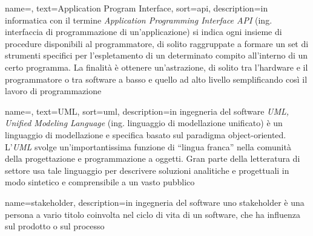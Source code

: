 
\renewcommand{\acronymname}{Acronimi e abbreviazioni}


    
	

\renewcommand{\glossaryname}{Glossario}

{
    name=,
    text=Application Program Interface,
    sort=api,
    description={in informatica con il termine \emph{Application Programming Interface API} (ing. interfaccia di programmazione di un'applicazione) si indica ogni insieme di procedure disponibili al programmatore, di solito raggruppate a formare un set di strumenti specifici per l'espletamento di un determinato compito all'interno di un certo programma. La finalità è ottenere un'astrazione, di solito tra l'hardware e il programmatore o tra software a basso e quello ad alto livello semplificando così il lavoro di programmazione}
}

{
    name=,
    text=UML,
    sort=uml,
    description={in ingegneria del software \emph{UML, Unified Modeling Language} (ing. linguaggio di modellazione unificato) è un linguaggio di modellazione e specifica basato sul paradigma object-oriented. L'\emph{UML} svolge un'importantissima funzione di ``lingua franca'' nella comunità della progettazione e programmazione a oggetti. Gran parte della letteratura di settore usa tale linguaggio per descrivere soluzioni analitiche e progettuali in modo sintetico e comprensibile a un vasto pubblico}
}

{
	name={stakeholder},
	description={in ingegneria del software uno stakeholder è una persona a vario titolo coinvolta nel ciclo di vita di un software, che ha influenza sul prodotto o sul processo}
}

